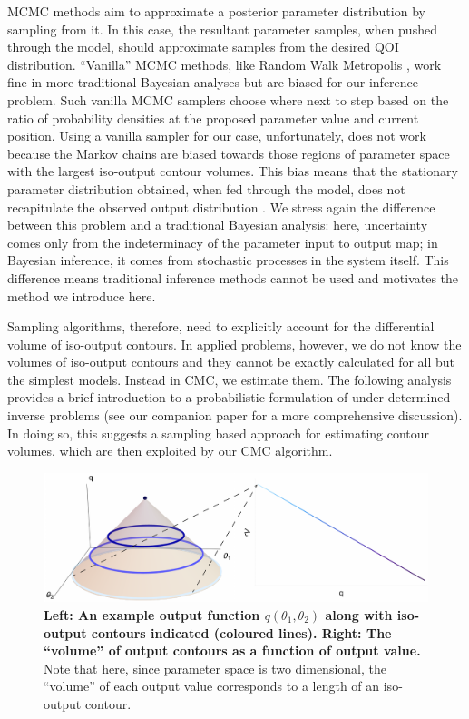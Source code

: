 MCMC methods aim to approximate a posterior parameter distribution by sampling from it. In this case, the resultant parameter samples, when pushed through the model, should approximate samples from the desired QOI distribution. ``Vanilla'' MCMC methods, like Random Walk Metropolis \cite{lambert2018Student}, work fine in more traditional Bayesian analyses but are biased for our inference problem. Such vanilla MCMC samplers choose where next to step based on the ratio of probability densities at the proposed parameter value and current position. Using a vanilla sampler for our case, unfortunately, does not work because the Markov chains are biased towards those regions of parameter space with the largest iso-output contour volumes. This bias means that the stationary parameter distribution obtained, when fed through the model, does not recapitulate the observed output distribution \cite{lambert2018inverse}. We stress again the difference between this problem and a traditional Bayesian analysis: here, uncertainty comes only from the indeterminacy of the parameter input to output map; in Bayesian inference, it comes from stochastic processes in the system itself. This difference means traditional inference methods cannot be used and motivates the method we introduce here.

Sampling algorithms, therefore, need to explicitly account for the differential volume of iso-output contours. In applied problems, however, we do not know the volumes of iso-output contours and they cannot be exactly calculated for all but the simplest models. Instead in CMC, we estimate them. The following analysis provides a brief introduction to a probabilistic formulation of under-determined inverse problems (see our companion paper \cite{lambert2018inverse} for a more comprehensive discussion). In doing so, this suggests a sampling based approach for estimating contour volumes, which are then exploited by our CMC algorithm.

\begin{figure}[H]
	\centerline{\includegraphics[width=\textwidth]{../figures/contour_volumes_redux.pdf}}
	\caption{\textbf{Left: An example output function $q(\theta_1,\theta_2)$ along with iso-output contours indicated (coloured lines). Right: The ``volume'' of output contours as a function of output value.} Note that here, since parameter space is two dimensional, the ``volume'' of each output value corresponds to a length of an iso-output contour.}
	\label{fig:contour_volumes}
\end{figure}

